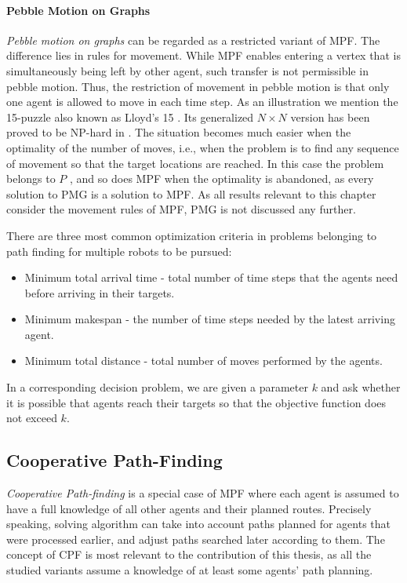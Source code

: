\paragraph{Pebble Motion on Graphs}
\emph{Pebble motion on graphs} \cite{kornhauser84} can be regarded as a restricted variant of MPF. 
The difference lies in rules for movement. 
While MPF enables entering a vertex that is simultaneously being left by other agent, such transfer is not permissible in pebble motion. 
Thus, the restriction of movement in pebble motion is that only one agent is allowed to move in each time step.
As an illustration we mention the 15-puzzle also known as Lloyd’s 15 \cite{archer99}.
Its generalized $N\times N$ version has been proved to be NP-hard in \cite{ratner86}.  
The situation becomes much easier when the optimality of the number of moves, i.e., when the problem is to find any sequence of movement so that the target locations are reached.
In this case the problem belongs to $P$ \cite{kornhauser84}, and so does MPF when the optimality is abandoned, as every solution to PMG is a solution to MPF.
As all results relevant to this chapter consider the movement rules of MPF, PMG is not discussed any further.

There are three most common optimization criteria \cite{yu13} in problems belonging to path finding for multiple robots to be pursued:
\begin{itemize}
        \item Minimum total arrival time - total number of time steps that the agents need before arriving in their targets.
        \item Minimum makespan - the number of time steps needed by the latest arriving agent.
        \item Minimum total distance - total number of moves performed by the agents.
\end{itemize}
In a corresponding decision problem, we are given a parameter $k$ and ask whether it is possible that agents reach their targets so that the objective function does not exceed $k$.
\subsection{Cooperative Path-Finding}\label{sec:cpf}

\emph{Cooperative Path-finding} \cite{silver05} is a special case of MPF where each agent is assumed to have a full knowledge of all other agents and their planned routes.
Precisely speaking, solving algorithm can take into account paths planned for agents that were processed earlier, and adjust paths searched later according to them.
The concept of CPF is most relevant to the contribution of this thesis, as all the studied variants assume a knowledge of at least some agents' path planning.

